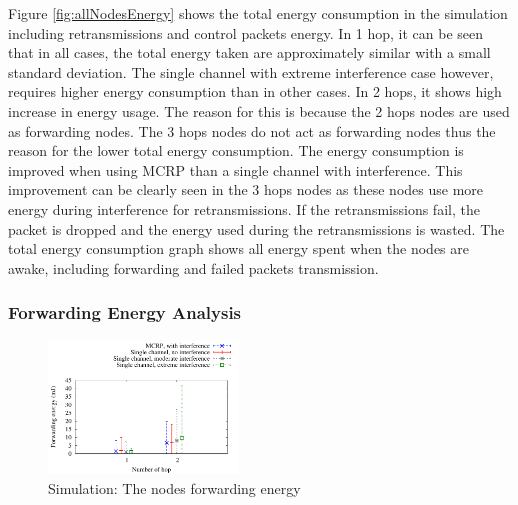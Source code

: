 Figure \ref{fig:allNodesEnergy} shows the total energy consumption in the simulation including retransmissions and control packets energy. 
In 1 hop, it can be seen that in all cases, the total energy taken are approximately similar with a small standard deviation. The single channel with extreme interference case however, requires higher energy consumption than in other cases.
In 2 hops, it shows high increase in energy usage. The reason for this is because the 2 hops nodes are used as forwarding nodes. The 3 hops nodes do not act as forwarding nodes thus the reason for the lower total energy consumption.
The energy consumption is improved when using MCRP than a single channel with interference. This improvement can be clearly seen in the 3 hops nodes as these nodes use more energy during interference for retransmissions. If the retransmissions fail, the packet is dropped and the energy used during the retransmissions is wasted. The total energy consumption graph shows all energy spent when the nodes are awake, including forwarding and failed packets transmission.

\subsubsection{Forwarding Energy Analysis}

\begin{figure}
\centering
\includegraphics[width=0.45\textwidth]{figures/fwdEnergy.pdf}
\caption{Simulation: The nodes forwarding energy}
\label{fig:allNodesFwdEnergy}
\end{figure}

